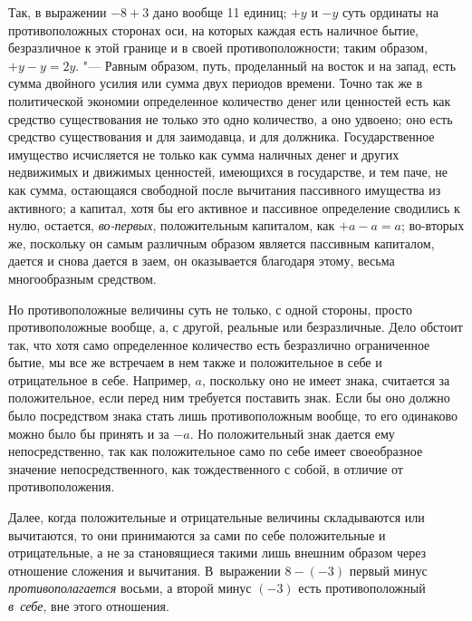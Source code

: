 Так, в выражении $-8+3$ дано вообще 11 единиц; $+y$ и $-y$ суть
ординаты на противоположных сторонах оси, на которых каждая есть наличное
бытие, безразличное к этой границе и в своей противоположности; таким
образом, $+y-y=2y$. "--- Равным образом, путь,
проделанный на восток и на запад, есть
сумма двойного усилия или сумма двух периодов времени. Точно так же в
политической экономии определенное количество денег или ценностей есть как
средство существования не только это одно количество, а оно удвоено; оно
есть средство существования и для заимодавца, и для должника.
Государственное имущество исчисляется не только как сумма наличных денег и
других недвижимых и движимых ценностей, имеющихся в государстве, и тем
паче, не как сумма, остающаяся свободной после вычитания пассивного
имущества из активного; а капитал, хотя бы его активное и пассивное
определение сводились к нулю, остается,
{\em во-первых}, положительным капиталом, как $+a-a=a$;
во-вторых же, поскольку он самым различным образом является пассивным
капиталом, дается и снова дается в заем, он оказывается благодаря этому,
весьма многообразным средством.

Но противоположные величины суть не только, с одной стороны, просто
противоположные вообще, а, с другой, реальные или безразличные. Дело
обстоит так, что хотя само определенное количество есть безразлично
ограниченное бытие, мы все же встречаем в нем также и положительное в себе
и отрицательное в себе. Например, $a$, поскольку
оно не имеет знака, считается за положительное, если перед ним требуется
поставить знак. Если бы оно должно было посредством знака стать лишь
противоположным вообще, то его одинаково можно было бы принять и за
$-a$. Но положительный знак дается ему
непосредственно, так как положительное само по себе имеет своеобразное
значение непосредственного, как тождественного с собой, в отличие от
противоположения.

Далее, когда положительные и отрицательные величины складываются или
вычитаются, то они принимаются за сами по себе положительные и
отрицательные, а не за становящиеся такими лишь внешним образом через
отношение сложения и вычитания. В~выражении $8-(-3)$ первый минус
{\em противополагается} восьми, а второй минус $(-3)$
есть противоположный {\em в~себе}, вне этого отношения.

